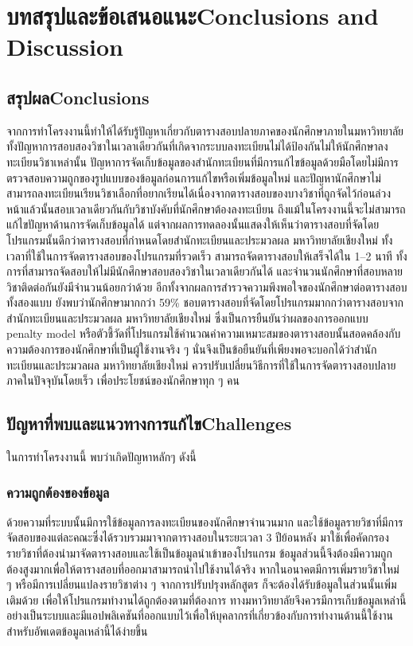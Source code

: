 \chapter{\ifcpe บทสรุปและข้อเสนอแนะ\else Conclusions and Discussion\fi}

\section{\ifcpe สรุปผล\else Conclusions\fi}

จากการทำโครงงานนี้ทำให้ได้รับรู้ปัญหาเกี่ยวกับตารางสอบปลายภาคของนักศึกษาภายในมหาวิทยาลัย
ทั้งปัญหาการสอบสองวิชาในเวลาเดียวกันที่เกิดจากระบบลงทะเบียนไม่ได้ป้องกันไม่ให้นักศึกษาลงทะเบียนวิชาเหล่านั้น
ปัญหาการจัดเก็บข้อมูลของสำนักทะเบียนที่มีการแก้ไขข้อมูลด้วยมือโดยไม่มีการตรวจสอบความถูกของรูปแบบของข้อมูลก่อนการแก้ไขหรือเพิ่มข้อมูลใหม่
และปัญหานักศึกษาไม่สามารถลงทะเบียนเรียนวิชาเลือกที่อยากเรียนได้เนื่องจากตารางสอบของบางวิชาที่ถูกจัดไว้ก่อนล่วงหน้าแล้วนั้นสอบเวลาเดียวกันกับวิชาบังคับที่นักศึกษาต้องลงทะเบียน
ถึงแม้ในโครงงานนี้จะไม่สามารถแก้ไขปัญหาด้านการจัดเก็บข้อมูลได้ แต่จากผลการทดลองนั้นแสดงให้เห็นว่าตารางสอบที่จัดโดยโปรแกรมนั้นดีกว่าตารางสอบที่กำหนดโดยสำนักทะเบียนและประมวลผล มหาวิทยาลัยเชียงใหม่
ทั้งเวลาที่ใช้ในการจัดตารางสอบของโปรแกรมที่รวดเร็ว สามารถจัดตารางสอบให้เสร็จได้ใน 1--2 นาที ทั้งการที่สามารถจัดสอบให้ไม่มีนักศึกษาสอบสองวิชาในเวลาเดียวกันได้
และจำนวนนักศึกษาที่สอบหลายวิชาติดต่อกันยังมีจำนวนน้อยกว่าด้วย อีกทั้งจากผลการสำรวจความพึงพอใจของนักศึกษาต่อตารางสอบทั้งสองแบบ ยังพบว่านักศึกษามากกว่า 59\%
ชอบตารางสอบที่จัดโดยโปรแกรมมากกว่าตารางสอบจากสำนักทะเบียนและประมวลผล มหาวิทยาลัยเชียงใหม่ ซึ่งเป็นการยืนยันว่าผลของการออกแบบ penalty model
หรือตัวชี้วัดที่โปรแกรมใช้คำนวณค่าความเหมาะสมของตารางสอบนั้นสอดคล้องกับความต้องการของนักศึกษาที่เป็นผู้ใช้งานจริง ๆ นั่นจึงเป็นข้อยืนยันที่เพียงพอจะบอกได้ว่าสำนักทะเบียนและประมวลผล มหาวิทยาลัยเชียงใหม่
ควรปรับเปลี่ยนวิธีการที่ใช้ในการจัดตารางสอบปลายภาคในปัจจุบันโดยเร็ว เพื่อประโยชน์ของนักศึกษาทุก ๆ คน

\section{\ifcpe ปัญหาที่พบและแนวทางการแก้ไข\else Challenges\fi}

ในการทำโครงงานนี้ พบว่าเกิดปัญหาหลักๆ ดังนี้
\subsection{ความถูกต้องของข้อมูล}
ด้วยความที่ระบบนั้นมีการใช้ข้อมูลการลงทะเบียนของนักศึกษาจำนวนมาก และใช้ข้อมูลรายวิชาที่มีการจัดสอบของแต่ละคณะซึ่งได้รวบรวมมาจากตารางสอบในระยะเวลา 3 ปีย้อนหลัง มาใช้เพื่อคัดกรองรายวิชาที่ต้องนำมาจัดตารางสอบและใช้เป็นข้อมูลนำเข้าของโปรแกรม ข้อมูลส่วนนี้จึงต้องมีความถูกต้องสูงมากเพื่อให้ตารางสอบที่ออกมาสามารถนำไปใช้งานได้จริง  หากในอนาคตมีการเพิ่มรายวิชาใหม่ ๆ หรือมีการเปลี่ยนแปลงรายวิชาต่าง ๆ จากการปรับปรุงหลักสูตร ก็จะต้องได้รับข้อมูลในส่วนนั้นเพิ่มเติมด้วย เพื่อให้โปรแกรมทำงานได้ถูกต้องตามที่ต้องการ
ทางมหาวิทยาลัยจึงควรมีการเก็บข้อมูลเหล่านี้อย่างเป็นระบบและมีแอปพลิเคชันที่ออกแบบไว้เพื่อให้บุคลากรที่เกี่ยวข้องกับการทำงานด้านนี้ใช้งานสำหรับอัพเดตข้อมูลเหล่านี้ได้ง่ายขึ้น

